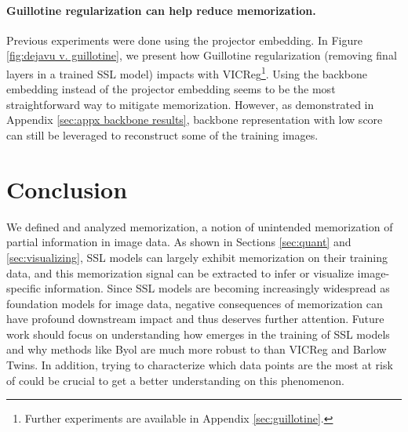 \paragraph{Guillotine regularization can help reduce \dejavu memorization.} Previous experiments were done using the projector embedding. In Figure \ref{fig:dejavu v. guillotine}, we present how Guillotine regularization\citep{Guillotine} (removing final layers in a trained SSL model) impacts \dejavu with VICReg\footnote{Further experiments are available in Appendix \ref{sec:guillotine}.}. Using the backbone embedding instead of the projector embedding seems to be the most straightforward way to mitigate \dejavu memorization. However, as demonstrated in Appendix \ref{sec:appx backbone results}, backbone representation with low \dejavu score can still be leveraged to reconstruct some of the training images.

\section{Conclusion}
\label{sec:conclusion}

We defined and analyzed \dejavu memorization, a notion of unintended memorization of partial information in image data. As shown in Sections \ref{sec:quant} and \ref{sec:visualizing}, SSL models can largely exhibit \dejavu memorization on their training data, and this memorization signal can be extracted to infer or visualize image-specific information.
Since SSL models are becoming increasingly widespread as foundation models for image data, negative consequences of \dejavu memorization can have profound downstream impact and thus deserves further attention. 
Future work should focus on understanding how \dejavu emerges in the training of SSL models and why methods like Byol are much more robust to \dejavu than VICReg and Barlow Twins. In addition, trying to characterize which data points are the most at risk of \dejavu could be crucial to get a better understanding on this phenomenon. 
